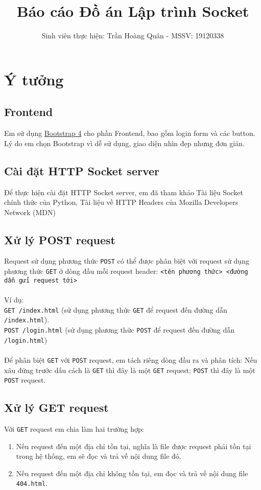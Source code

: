 \documentclass[]{article}
\title{Báo cáo Đồ án Lập trình Socket}
\author{Sinh viên thực hiện: Trần Hoàng Quân - MSSV: 19120338}
\begin{document}
\maketitle
\tableofcontents
\pagebreak

\section{Ý tưởng}
\subsection{Frontend}
Em sử dụng \href{https://getbootstrap.com}{Bootstrap 4} cho phần Frontend, bao gồm login form và các button. Lý do em chọn Bootstrap vì dễ sử dụng, giao diện nhìn đẹp nhưng đơn giản.

\subsection{Cài đặt HTTP Socket server}
Để thực hiện cài đặt HTTP Socket server, em đã tham khảo Tài liệu Socket chính thức của Python\cite{socket}, Tài liệu về HTTP Headers của Mozilla Developers Network (MDN)\cite{headers}

\subsection{Xử lý POST request}
Request sử dụng phương thức \texttt{POST} có thể được phân biệt với request sử dụng phương thức \texttt{GET} ở dòng đầu mỗi request header:
\texttt{<tên phương thức> <đường dẫn gửi request tới>}
\\\\
Ví dụ:
\\
\texttt{GET /index.html} (sử dụng phương thức \texttt{GET} để request đến đường dẫn \texttt{/index.html}).
\\
\texttt{POST /login.html} (sử dụng phương thức \texttt{POST} để request đến đường dẫn \texttt{/login.html})
\\\\
Để phân biệt \texttt{GET} với \texttt{POST} request, em tách riêng dòng đầu ra và phân tích: Nếu xâu đứng trước dấu cách là \texttt{GET} thì đây là một \texttt{GET} request; \texttt{POST} thì đây là một \texttt{POST} request.

\subsection{Xử lý GET request}
Với \texttt{GET} request em chia làm hai trường hợp:
\begin{enumerate}
\item Nếu request đến một địa chỉ tồn tại, nghĩa là file được request phải tồn tại trong hệ thống, em sẽ đọc và trả về nội dung file đó.
\item Nếu request đến một địa chỉ không tồn tại, em đọc và trả về nội dung file \texttt{404.html}.
\end{enumerate}
\end{document}

